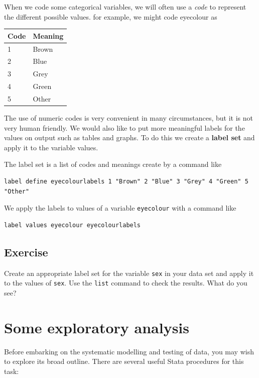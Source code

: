 \documentclass[
]{article}
\begin{document}
When we code some categorical variables, we will often use a \emph{code} to represent the different possible values. for example, we might code eyecolour as

\begin{longtable}[]{@{}ll@{}}
\toprule
Code & Meaning \\
\midrule
\endhead
1 & Brown \\
2 & Blue \\
3 & Grey \\
4 & Green \\
5 & Other \\
\bottomrule
\end{longtable}

The use of numeric codes is very convenient in many circumstances, but it is not very human friendly. We would also like to put more meaningful labels for the values on output such as tables and graphs. To do this we create a \textbf{label set} and apply it to the variable values.

The label set is a list of codes and meanings create by a command like

\begin{verbatim}
label define eyecolourlabels 1 "Brown" 2 "Blue" 3 "Grey" 4 "Green" 5 "Other"
\end{verbatim}

We apply the labels to values of a variable \texttt{eyecolour} with a command like

\begin{verbatim}
label values eyecolour eyecolourlabels
\end{verbatim}

\hypertarget{exercise-10}{%
\subsection{Exercise}\label{exercise-10}}

Create an appropriate label set for the variable \texttt{sex} in your data set and apply it to the values of \texttt{sex}. Use the \texttt{list} command to check the results. What do you see?

\hypertarget{some-exploratory-analysis}{%
\section{Some exploratory analysis}\label{some-exploratory-analysis}}

Before embarking on the systematic modelling and testing of data, you may wish to explore its broad outline. There are several useful Stata procedures for this task:
\end{document}
